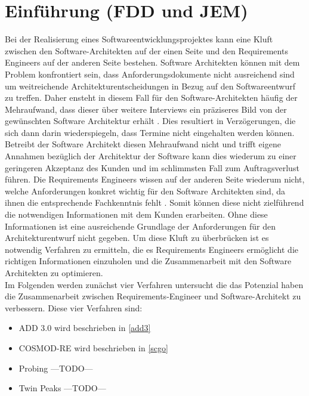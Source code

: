 \section{Einf\"uhrung (FDD und JEM)}
Bei der Realisierung eines Softwareentwicklungsprojektes kann eine Kluft zwischen den Software-Architekten auf der einen Seite und den Requirements Engineers auf der anderen Seite bestehen. Software Architekten können mit dem Problem konfrontiert sein, dass Anforderungsdokumente nicht ausreichend sind um weitreichende Architekturentscheidungen in Bezug auf den Softwareentwurf zu treffen. Daher ensteht in diesem Fall für den Software-Architekten häufig der Mehraufwand, dass dieser über weitere Interviews ein präziseres Bild von der gewünschten Software Architektur erhält \cite{probing}. Dies resultiert in Verzögerungen, die sich dann darin wiederspiegeln, dass Termine nicht eingehalten werden können. Betreibt der Software Architekt diesen Mehraufwand nicht und trifft eigene Annahmen bezüglich der Architektur der Software \cite{probing} kann dies wiederum zu einer geringeren Akzeptanz des Kunden und im schlimmsten Fall zum Auftragsverlust führen. Die Requirements Engineers wissen auf der anderen Seite wiederum nicht, welche Anforderungen konkret wichtig für den Software Architekten sind, da ihnen die entsprechende Fachkenntnis fehlt \cite{probing}. Somit können diese nicht zielführend die notwendigen Informationen mit dem Kunden erarbeiten. Ohne diese Informationen ist eine ausreichende Grundlage der Anforderungen für den Architekturentwurf nicht gegeben. Um diese Kluft zu überbrücken ist es notwendig Verfahren zu ermitteln, die es Requirements Engineers ermöglicht die richtigen Informationen einzuholen und die Zusammenarbeit mit den Software Architekten zu optimieren.\\

Im Folgenden werden zunächst vier Verfahren untersucht die das Potenzial haben die Zusammenarbeit zwischen Requirements-Engineer und Software-Architekt zu verbessern. Diese vier Verfahren sind:\\

\begin{itemize}
\item ADD 3.0 wird beschrieben in \ref{add3}
\item COSMOD-RE wird beschrieben in \ref{scgo}
\item Probing ---TODO---
\item Twin Peaks ---TODO---\\
\end{itemize}


